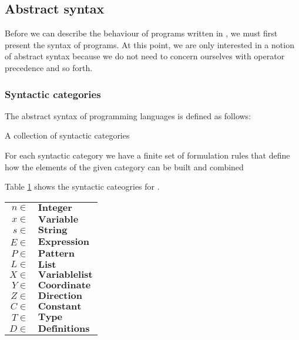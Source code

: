 \subsection{Abstract syntax}
Before we can describe the behaviour of programs written in
\productname{}, we must first present the syntax of programs. At this point, we 
are only interested in a notion of abstract syntax because we do not need to
concern ourselves with operator precedence and so forth.

\subsubsection{Syntactic categories}
The abstract syntax of programming languages is defined as
follows\cite[pg. 27]{tt-hh}:

\begin{dlist}
  \item A collection of syntactic categories
  \item For each syntactic category we have a finite set of formulation rules
    that define how the elements of the given category can be built and
    combined
\end{dlist}

Table \ref{table:syn-cat} shows the syntactic cateogries for
\productname{}.

\begin{table}[ht]
  \begin{center}
    \begin{tabular}{rl}
      \hline
      $n \in$ & $\mathbf{Integer}$       \\
      $x \in$ & $\mathbf{Variable}$      \\
      $s \in$ & $\mathbf{String}$        \\
      $E \in$ & $\mathbf{Expression}$    \\
      $P \in$ & $\mathbf{Pattern}$       \\
      $L \in$ & $\mathbf{List}$          \\
      $X \in$ & $\mathbf{Variable list}$ \\
      $Y \in$ & $\mathbf{Coordinate}$    \\
      $Z \in$ & $\mathbf{Direction}$     \\
      $C \in$ & $\mathbf{Constant}$      \\
      $T \in$ & $\mathbf{Type}$          \\
      $D \in$ & $\mathbf{Definitions}$   \\
      \hline
    \end{tabular}  
    \label{table:syn-cat}
  \end{center}
\end{table}

